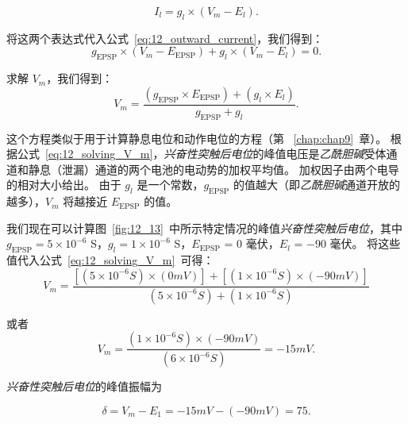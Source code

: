 \begin{equation}\label{eq:12_current_resting}
	I_l = g_l \times (V_m - E_l).
\end{equation}

将这两个表达式代入公式~\ref{eq:12_outward_current}，我们得到：
\begin{equation}\label{eq:12_outward_current_substituting}
	g_{\text{EPSP}} \times (V_m - E_{\text{EPSP}}) + 
	g_l \times (V_m - E_l) = 0.
\end{equation}

求解 $V_m$，我们得到：
\begin{equation}\label{eq:12_solving_V_m}
	V_m = 
	\frac{
		(g_{\text{EPSP}} \times E_{\text{EPSP}}) + 
		(g_l \times E_l)
	}{
		g_{\text{EPSP}} + g_l
	}.
\end{equation}

这个方程类似于用于计算静息电位和动作电位的方程（第 ~\ref{chap:chap9}~章）。
根据公式~\ref{eq:12_solving_V_m}，\textit{兴奋性突触后电位}的峰值电压是\textit{乙酰胆碱}受体通道和静息（泄漏）通道的两个电池的电动势的加权平均值。
加权因子由两个电导的相对大小给出。
由于 $ g_l $ 是一个常数，$ g_{\text{EPSP}} $ 的值越大（即\textit{乙酰胆碱}通道开放的越多），$V_m$ 将越接近 $E_{\text{EPSP}}$ 的值。


我们现在可以计算图~\ref{fig:12_13}~中所示特定情况的峰值\textit{兴奋性突触后电位}，其中 $ g_{\text{EPSP}} = 5 \times 10^{−6}$ S，$ g_l = 1 \times 10^{−6}$ S，$E_{\text{EPSP}}$ = 0 毫伏，$ E_l $ = −90 毫伏。
将这些值代入公式~\ref{eq:12_solving_V_m}~可得：
\begin{equation}\label{eq:12_substituting_V_m_1}
	V_m = 
	\frac{
		[
		(5 \times 10^{-6} \textit{S}) \times (0 \textit{mV})
		] 
		+ 
		[
			(1 \times 10^{-6} \textit{S}) \times
			(-90 \textit{mV})
		]
	}{
		(5 \times 10^{-6} \textit{S})
		+ 
		(1 \times 10^{-6} S)
	}
\end{equation}

或者
\begin{equation}\label{eq:12_substituting_V_m_2}
	V_m = 
	\frac{
		(1 \times 10^{-6} \textit{S})
		\times
		(-90 \textit{mV})
	}{
		(6 \times 10^{-6} \textit{S})
	}
	= -15 \textit{mV}.
\end{equation}


\textit{兴奋性突触后电位}的峰值振幅为

\begin{equation}\label{peak_amplitude}
	\delta = V_m - E_1 = -15 \textit{mV} - (-90\textit{mV}) = 75.
\end{equation}


